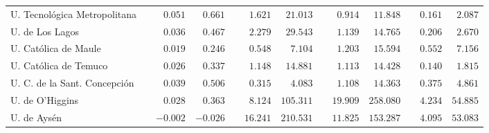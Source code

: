 \begin{tabular}{l crr crr crr crr}
U. Tecnológica Metropolitana   & & $      0.051$ & $        0.661$ & & $      1.621$ & $       21.013$ & & $      0.914$ & $       11.848$ & & $      0.161$ & $        2.087$ \\
U. de Los Lagos                & & $      0.036$ & $        0.467$ & & $      2.279$ & $       29.543$ & & $      1.139$ & $       14.765$ & & $      0.206$ & $        2.670$ \\
U. Católica de Maule           & & $      0.019$ & $        0.246$ & & $      0.548$ & $        7.104$ & & $      1.203$ & $       15.594$ & & $      0.552$ & $        7.156$ \\
U. Católica de Temuco          & & $      0.026$ & $        0.337$ & & $      1.148$ & $       14.881$ & & $      1.113$ & $       14.428$ & & $      0.140$ & $        1.815$ \\
U. C. de la Sant. Concepción   & & $      0.039$ & $        0.506$ & & $      0.315$ & $        4.083$ & & $      1.108$ & $       14.363$ & & $      0.375$ & $        4.861$ \\
U. de O'Higgins                & & $      0.028$ & $        0.363$ & & $      8.124$ & $      105.311$ & & $     19.909$ & $      258.080$ & & $      4.234$ & $       54.885$ \\
U. de Aysén                    & & $     -0.002$ & $       -0.026$ & & $     16.241$ & $      210.531$ & & $     11.825$ & $      153.287$ & & $      4.095$ & $       53.083$ \\
\hline
\end{tabular}
